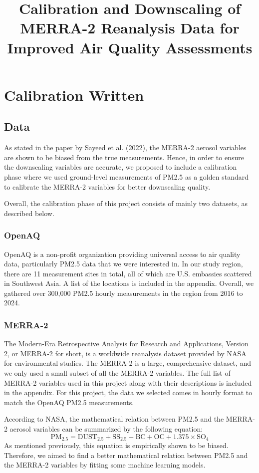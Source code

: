 \documentclass[draft]{agujournal2019}
\begin{document}
\title{Calibration and Downscaling of MERRA-2 Reanalysis Data for Improved Air Quality Assessments}

\section{Calibration Written}

\subsection{Data}

As stated in the paper by Sayeed et al. (2022), the MERRA-2 aerosol variables are shown to be biased from the true measurements. Hence, in order to ensure the downscaling variables are accurate, we proposed to include a calibration phase where we used ground-level measurements of PM2.5 as a golden standard to calibrate the MERRA-2 variables for better downscaling quality.

Overall, the calibration phase of this project consists of mainly two datasets, as described below.

\subsubsection{OpenAQ}

OpenAQ is a non-profit organization providing universal access to air quality data, particularly PM2.5 data that we were interested in. In our study region, there are 11 measurement sites in total, all of which are U.S. embassies scattered in Southwest Asia. A list of the locations is included in the appendix. Overall, we gathered over 300,000 PM2.5 hourly measurements in the region from 2016 to 2024.

\subsubsection{MERRA-2}

The Modern-Era Retrospective Analysis for Research and Applications, Version 2, or MERRA-2 for short, is a worldwide reanalysis dataset provided by NASA for environmental studies. The MERRA-2 is a large, comprehensive dataset, and we only used a small subset of all the MERRA-2 variables. The full list of MERRA-2 variables used in this project along with their descriptions is included in the appendix. For this project, the data we selected comes in hourly format to match the OpenAQ PM2.5 measurements.

According to NASA, the mathematical relation between PM2.5 and the MERRA-2 aerosol variables can be summarized by the following equation:
\[\text{PM}_{2.5} = \text{DUST}_{2.5} + \text{SS}_{2.5} + \text{BC} + \text{OC} + 1.375 \times \text{SO}_4\]
As mentioned previously, this equation is empirically shown to be biased. Therefore, we aimed to find a better mathematical relation between PM2.5 and the MERRA-2 variables by fitting some machine learning models.
\end{document}
